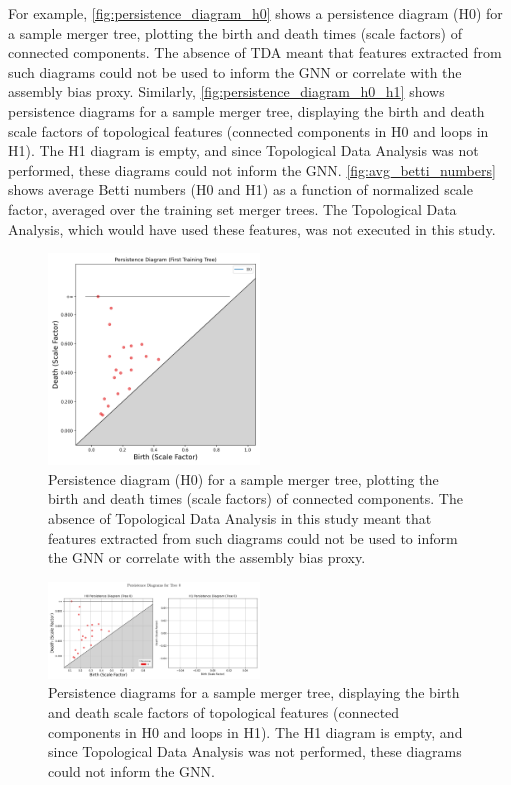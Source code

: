 \documentclass[twocolumn]{aastex631}
\begin{document}
For example, \autoref{fig:persistence_diagram_h0} shows a persistence diagram (H0) for a sample merger tree, plotting the birth and death times (scale factors) of connected components. The absence of TDA meant that features extracted from such diagrams could not be used to inform the GNN or correlate with the assembly bias proxy. Similarly, \autoref{fig:persistence_diagram_h0_h1} shows persistence diagrams for a sample merger tree, displaying the birth and death scale factors of topological features (connected components in H0 and loops in H1). The H1 diagram is empty, and since Topological Data Analysis was not performed, these diagrams could not inform the GNN. \autoref{fig:avg_betti_numbers} shows average Betti numbers (H0 and H1) as a function of normalized scale factor, averaged over the training set merger trees. The Topological Data Analysis, which would have used these features, was not executed in this study.

\begin{figure}[htbp]
    \centering
    \includegraphics[width=0.5\textwidth]{../input_files/plots/persistence_diagram_1_1748137556.png}
    \caption{\label{fig:persistence_diagram_h0}Persistence diagram (H0) for a sample merger tree, plotting the birth and death times (scale factors) of connected components. The absence of Topological Data Analysis in this study meant that features extracted from such diagrams could not be used to inform the GNN or correlate with the assembly bias proxy.}
\end{figure}

\begin{figure}[htbp]
    \centering
    \includegraphics[width=0.5\textwidth]{../input_files/plots/persistence_diagram_tree0_20250524214205.png}
    \caption{\label{fig:persistence_diagram_h0_h1}Persistence diagrams for a sample merger tree, displaying the birth and death scale factors of topological features (connected components in H0 and loops in H1). The H1 diagram is empty, and since Topological Data Analysis was not performed, these diagrams could not inform the GNN.}
\end{figure}
\end{document}
